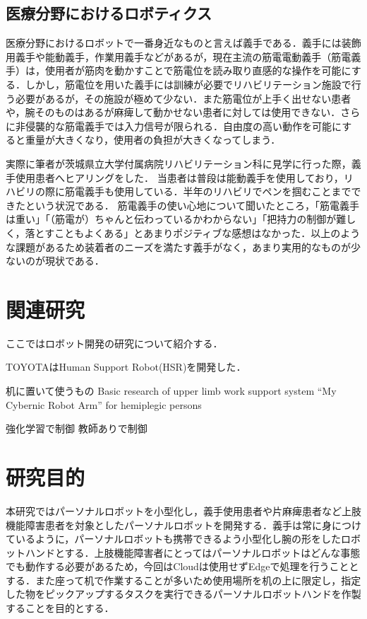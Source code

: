 \subsection{医療分野におけるロボティクス}
医療分野におけるロボットで一番身近なものと言えば義手である．義手には装飾用義手や能動義手，作業用義手などがあるが，現在主流の筋電電動義手（筋電義手）は，使用者が筋肉を動かすことで筋電位を読み取り直感的な操作を可能にする．しかし，筋電位を用いた義手には訓練が必要でリハビリテーション施設で行う必要があるが，その施設が極めて少ない\cite{リハビリテーション}．また筋電位が上手く出せない患者や，腕そのものはあるが麻痺して動かせない患者に対しては使用できない．さらに非侵襲的な筋電義手では入力信号が限られる．自由度の高い動作を可能にすると重量が大きくなり，使用者の負担が大きくなってしまう．

実際に筆者が茨城県立大学付属病院リハビリテーション科に見学に行った際，義手使用患者へヒアリングをした．
当患者は普段は能動義手を使用しており，リハビリの際に筋電義手も使用している．半年のリハビリでペンを掴むことまでできたという状況である．
筋電義手の使い心地について聞いたところ，「筋電義手は重い」「（筋電が）ちゃんと伝わっているかわからない」「把持力の制御が難しく，落とすこともよくある」とあまりポジティブな感想はなかった．以上のような課題があるため装着者のニーズを満たす義手がなく，あまり実用的なものが少ないのが現状である．


\section{関連研究}
ここではロボット開発の研究について紹介する．

TOYOTAはHuman Support Robot(HSR)を開発した\cite{HSR}．



机に置いて使うもの
Basic research of upper limb work support system “My Cybernic Robot Arm” for hemiplegic persons


強化学習で制御
教師ありで制御


\section{研究目的}

本研究ではパーソナルロボットを小型化し，義手使用患者や片麻痺患者など上肢機能障害患者を対象としたパーソナルロボットを開発する．義手は常に身につけているように，パーソナルロボットも携帯できるよう小型化し腕の形をしたロボットハンドとする．上肢機能障害者にとってはパーソナルロボットはどんな事態でも動作する必要があるため，今回はCloudは使用せずEdgeで処理を行うこととする．また座って机で作業することが多いため使用場所を机の上に限定し，指定した物をピックアップするタスクを実行できるパーソナルロボットハンドを作製することを目的とする．
